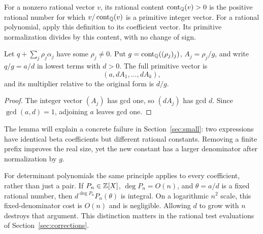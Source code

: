 \begin{definition}
For a nonzero rational vector $v$, its rational content $\operatorname{cont}_{\mathbb Q}(v)>0$
is the positive rational number for which $v/\operatorname{cont}_{\mathbb Q}(v)$ is a primitive
integer vector. For a rational polynomial, apply this definition to
its coefficient vector. Its primitive normalization divides by this
content, with no change of sign.
\end{definition}

\begin{lemma}\label{lem:constant-cost}
Let $q+\sum_j\rho_j\alpha_j$ have some $\rho_j\ne0$. Put
$g=\operatorname{cont}_{\mathbb Q}((\rho_j)_j)$, $A_j=\rho_j/g$, and write $q/g=a/d$ in lowest
terms with $d>0$. The full primitive vector is
\[
             (a,dA_1,\ldots,dA_k),
\]
and its multiplier relative to the original form is $d/g$.
\end{lemma}
\begin{proof}
The integer vector $(A_j)$ has gcd one, so $(dA_j)$ has gcd $d$.
Since $\gcd(a,d)=1$, adjoining $a$ leaves gcd one.
\end{proof}

The lemma will explain a concrete failure in Section~\ref{sec:small}:
two expressions have identical beta coefficients but different rational
constants. Removing a finite prefix improves the real size, yet the new
constant has a larger denominator after normalization by $g$.

For determinant polynomials the same principle applies to every
coefficient, rather than just a pair. If $P_n\in\mathbb Z[X]$, $\deg P_n=O(n)$,
and $\theta=a/d$ is a fixed rational number, then
$d^{\deg P_n}P_n(\theta)$ is integral. On a logarithmic $n^2$ scale,
this fixed-denominator cost is $O(n)$ and is negligible. Allowing $d$
to grow with $n$ destroys that argument. This distinction matters in
the rational test evaluations of Section~\ref{sec:corrections}.

